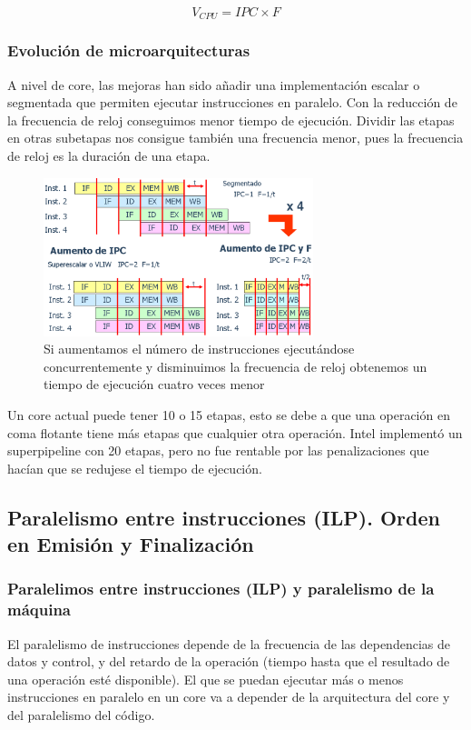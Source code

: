 \documentclass[10pt,a4paper,spanish]{report}
\begin{document}
\begin{displaymath}
V_{CPU} = IPC \times F
\end{displaymath}

\textcolor{azul}{\subsubsection{Evolución de microarquitecturas}}
A nivel de core, las mejoras han sido añadir una implementación escalar o segmentada que permiten ejecutar instrucciones en paralelo. Con la reducción de la frecuencia de reloj conseguimos menor tiempo de ejecución. Dividir las etapas en otras subetapas nos consigue también una frecuencia menor, pues la frecuencia de reloj es la duración de una etapa. 

\begin{figure}[!h]
\centering
\includegraphics[width=0.7\textwidth]{81}
\caption{Si aumentamos el número de instrucciones ejecutándose concurrentemente y disminuimos la frecuencia de reloj obtenemos un tiempo de ejecución cuatro veces menor}
\label{microarquitecturas}
\end{figure}

Un core actual puede tener 10 o 15 etapas, esto se debe a que una operación en coma flotante tiene más etapas que cualquier otra operación. Intel implementó un superpipeline con 20 etapas, pero no fue rentable por las penalizaciones que hacían que se redujese el tiempo de ejecución.

\textcolor{azul}{\subsection{Paralelismo entre instrucciones (ILP). Orden en Emisión y Finalización}}
\textcolor{azul}{\subsubsection{Paralelimos entre instrucciones (ILP) y paralelismo de la máquina}}
El paralelismo de instrucciones depende de la frecuencia de las dependencias de datos y control, y del retardo de la operación (tiempo hasta que el resultado de una operación esté disponible). El que se puedan ejecutar más o menos instrucciones en paralelo en un core va a depender de la arquitectura del core y del paralelismo del código.
\end{document}
